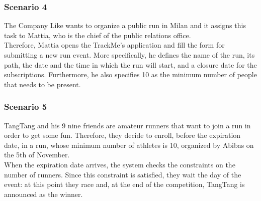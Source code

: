 \subsubsection{Scenario 4}
The Company Like wants to organize a public run in Milan and it assigns this task to Mattia, who is the chief of the public relations office. \\
Therefore, Mattia opens the TrackMe's application and fill the form for submitting a new run event. 
More specifically, he defines the name of the run, its path, the date and the time in which the run will start, and a closure date for the subscriptions. 
Furthermore, he also specifies 10 as the minimum number of people that needs to be present.

\subsubsection{Scenario 5}
TangTang and his 9 nine friends are amateur runners that want to join a run in order to get some fun. 
Therefore, they decide to enroll, before the expiration date, in a run, whose minimum number of athletes is 10, organized by Abibas on the 5th of November. \\
When the expiration date arrives, the system checks the constraints on the number of runners. 
Since this constraint is satisfied, they wait the day of the event: at this point they race and, at the end of the competition, TangTang is announced as the winner. 
